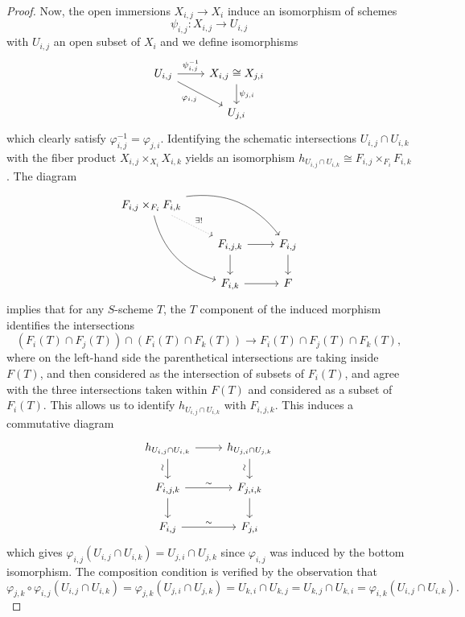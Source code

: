\documentclass[10pt]{amsart}
\begin{document}
\begin{thm}
\begin{proof}
    Now, the open immersions $X_{i,j} \rightarrow X_i$ induce an isomorphism of schemes
    $$\psi_{i,j} : X_{i,j} \rightarrow U_{i,j}$$
    with $U_{i,j}$ an open subset of $X_i$ and we define isomorphisms
    $$\begin{tikzcd}
      U_{i,j} \arrow[swap]{rd}{\varphi_{i,j}}\arrow{r}{\psi_{i,j}^{-1}} & X_{i,j} \cong X_{j,i}\arrow{d}{\psi_{j,i}}\\
      & U_{j,i}
    \end{tikzcd}$$
    which clearly satisfy $\varphi_{i,j}^{-1} = \varphi_{j,i}$.
    Identifying the schematic intersections $U_{i,j} \cap U_{i,k}$ with the fiber product $X_{i,j} \times_{X_i} X_{i,k}$ yields an isomorphism $h_{U_{i,j} \cap U_{i,k}} \cong F_{i,j} \times_{F_{i}} F_{i,k}$.
    The diagram
    $$\begin{tikzcd}
      F_{i,j} \times_{F_i} F_{i,k}\arrow[bend right]{rdd}\arrow[bend left]{rrd}\arrow[dotted]{rd}{\exists !}\\
      & F_{i,j,k}\arrow{r}\arrow{d} & F_{i,j}\arrow{d}\\
      & F_{i,k}\arrow{r} & F
    \end{tikzcd}$$
    implies that for any $S$-scheme $T$, the $T$ component of the induced morphism identifies the intersections
    $$(F_i(T) \cap F_j(T)) \cap (F_i(T) \cap F_k(T)) \rightarrow F_i(T) \cap F_j(T) \cap F_k(T),$$
    where on the left-hand side the parenthetical intersections are taking inside $F(T)$, and then considered as the intersection of subsets of $F_i(T)$, and agree with the three intersections taken within $F(T)$ and considered as a subset of $F_i(T)$.
    This allows us to identify $h_{U_{i,j} \cap U_{i,k}}$ with $F_{i,j,k}$.
    This induces a commutative diagram
    $$\begin{tikzcd}
      h_{U_{i,j} \cap U_{i,k}}\arrow{d}[rotate=90,yshift=1ex,xshift=-1ex]{\sim}\arrow{r} & h_{U_{j,i} \cap U_{j,k}}\arrow{d}[rotate=90,yshift=1ex,xshift=-1ex]{\sim}\\
      F_{i,j,k} \arrow{d}\arrow{r}{\sim} & F_{j, i, k}\arrow{d}\\
      F_{i,j} \arrow{r}{\sim} & F_{j,i}
    \end{tikzcd}$$
    which gives $\varphi_{i,j}(U_{i,j} \cap U_{i,k}) = U_{j,i} \cap U_{j,k}$ since $\varphi_{i,j}$ was induced by the bottom isomorphism.
    The composition condition is verified by the observation that
    $$\varphi_{j,k} \circ \varphi_{i,j} (U_{i,j} \cap U_{i,k}) = \varphi_{j,k}(U_{j,i} \cap U_{j,k}) = U_{k,i} \cap U_{k,j} = U_{k,j} \cap U_{k,i} = \varphi_{i,k}(U_{i,j} \cap U_{i,k}).$$

\end{proof}
\end{thm}
\end{document}
